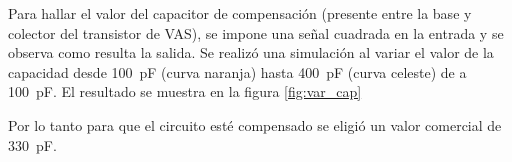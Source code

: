 Para hallar el valor del capacitor de compensación (presente entre la base y colector del transistor de VAS), se impone una señal cuadrada en la entrada y se observa como resulta la salida. Se realizó una simulación al variar el valor de la capacidad desde \SI{100}{\pico\farad} (curva naranja) hasta \SI{400}{\pico\farad} (curva celeste) de a \SI{100}{\pico\farad}. El resultado se muestra en la figura \ref{fig:var_cap}



Por lo tanto para que el circuito esté compensado se eligió un valor comercial de \SI{330}{\pico\farad}.